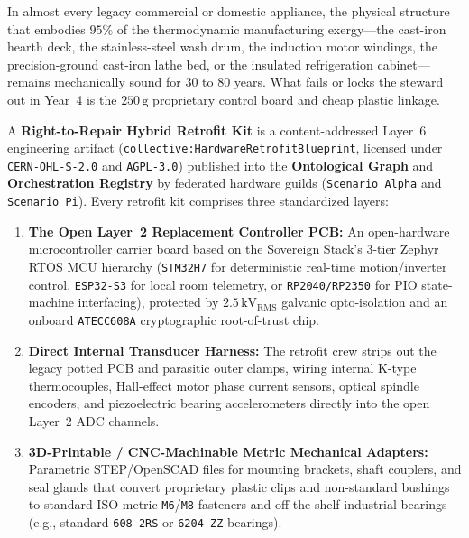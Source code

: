 In almost every legacy commercial or domestic appliance, the physical structure that embodies $95\%$ of the thermodynamic manufacturing exergy---the cast-iron hearth deck, the stainless-steel wash drum, the induction motor windings, the precision-ground cast-iron lathe bed, or the insulated refrigeration cabinet---remains mechanically sound for 30 to 80 years. What fails or locks the steward out in Year~4 is the $250\,\mathrm{g}$ proprietary control board and cheap plastic linkage.

A \textbf{Right-to-Repair Hybrid Retrofit Kit} is a content-addressed Layer~6 engineering artifact (\texttt{collective:HardwareRetrofitBlueprint}, licensed under \texttt{CERN-OHL-S-2.0} and \texttt{AGPL-3.0}) published into the \textbf{Ontological Graph} and \textbf{Orchestration Registry} by federated hardware guilds (\texttt{Scenario Alpha} and \texttt{Scenario Pi}). Every retrofit kit comprises three standardized layers:
\begin{enumerate}
    \item \textbf{The Open Layer~2 Replacement Controller PCB:} An open-hardware microcontroller carrier board based on the Sovereign Stack's 3-tier Zephyr RTOS MCU hierarchy (\texttt{STM32H7} for deterministic real-time motion/inverter control, \texttt{ESP32-S3} for local room telemetry, or \texttt{RP2040/RP2350} for PIO state-machine interfacing), protected by $2.5\,\mathrm{kV}_{\mathrm{RMS}}$ galvanic opto-isolation and an onboard \texttt{ATECC608A} cryptographic root-of-trust chip.
    \item \textbf{Direct Internal Transducer Harness:} The retrofit crew strips out the legacy potted PCB and parasitic outer clamps, wiring internal K-type thermocouples, Hall-effect motor phase current sensors, optical spindle encoders, and piezoelectric bearing accelerometers directly into the open Layer~2 ADC channels.
    \item \textbf{3D-Printable / CNC-Machinable Metric Mechanical Adapters:} Parametric STEP/OpenSCAD files for mounting brackets, shaft couplers, and seal glands that convert proprietary plastic clips and non-standard bushings to standard ISO metric \texttt{M6}/\texttt{M8} fasteners and off-the-shelf industrial bearings (e.g., standard \texttt{608-2RS} or \texttt{6204-ZZ} bearings).
\end{enumerate}

